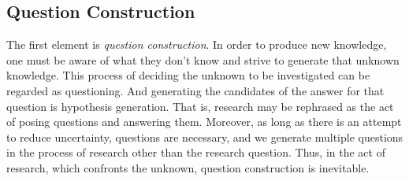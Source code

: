 




\subsection{Question Construction}

The first element is \textit{question construction}. In order to produce new knowledge, one must be aware of what they don't know and strive to generate that unknown knowledge. This process of deciding the unknown to be investigated can be regarded as questioning. And generating the candidates of the answer for that question is hypothesis generation. That is, research may be rephrased as the act of posing questions and answering them. Moreover, as long as there is an attempt to reduce uncertainty, questions are necessary, and we generate multiple questions in the process of research other than the research question. Thus, in the act of research, which confronts the unknown, question construction is inevitable.

